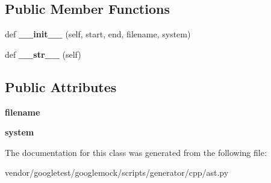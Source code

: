 \subsection*{Public Member Functions}
\begin{DoxyCompactItemize}
\item 
def {\bfseries \+\_\+\+\_\+init\+\_\+\+\_\+} (self, start, end, filename, system)\hypertarget{classcpp_1_1ast_1_1Include_a41b000a9f16a9a1840e56a761bb7045c}{}\label{classcpp_1_1ast_1_1Include_a41b000a9f16a9a1840e56a761bb7045c}

\item 
def {\bfseries \+\_\+\+\_\+str\+\_\+\+\_\+} (self)\hypertarget{classcpp_1_1ast_1_1Include_ad7d9e5e8f46dcb1a91a282e609412a3e}{}\label{classcpp_1_1ast_1_1Include_ad7d9e5e8f46dcb1a91a282e609412a3e}

\end{DoxyCompactItemize}
\subsection*{Public Attributes}
\begin{DoxyCompactItemize}
\item 
{\bfseries filename}\hypertarget{classcpp_1_1ast_1_1Include_a9ecff64f127655d3c17e9abe4ebe3852}{}\label{classcpp_1_1ast_1_1Include_a9ecff64f127655d3c17e9abe4ebe3852}

\item 
{\bfseries system}\hypertarget{classcpp_1_1ast_1_1Include_a2e8e535b1af7d9b0ff94d0ae9f86e5c5}{}\label{classcpp_1_1ast_1_1Include_a2e8e535b1af7d9b0ff94d0ae9f86e5c5}

\end{DoxyCompactItemize}


The documentation for this class was generated from the following file\+:\begin{DoxyCompactItemize}
\item 
vendor/googletest/googlemock/scripts/generator/cpp/ast.\+py\end{DoxyCompactItemize}
